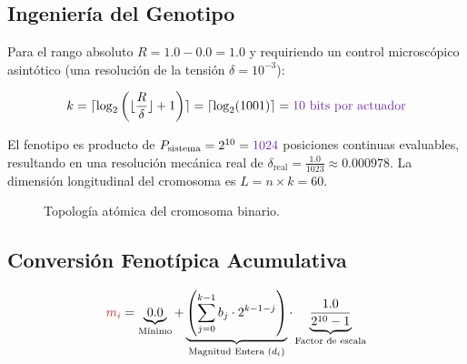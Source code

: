 \documentclass[11pt, a4paper]{article}
\begin{document}
\subsection{Ingeniería del Genotipo}
Para el rango absoluto $R = 1.0 - 0.0 = 1.0$ y requiriendo un control microscópico asintótico (una resolución de la tensión $\delta = 10^{-3}$):

\begin{equation}
k = \lceil \log_2\left( \lfloor\frac{R}{\delta}\rfloor + 1 \right) \rceil = \lceil \log_2(1001) \rceil = \textcolor{corepurple}{10 \text{ bits por actuador}}
\end{equation}

El fenotipo es producto de $P_{\text{sistema}} = 2^{10} = \textcolor{corepurple}{1024}$ posiciones continuas evaluables, resultando en una resolución mecánica real de $\delta_{\text{real}} = \frac{1.0}{1023} \approx 0.000978$. La dimensión longitudinal del cromosoma es $L = n \times k = 60$.

\begin{figure}[H]
    \centering
    \caption{Topología atómica del cromosoma binario.}
\end{figure}

\subsection{Conversión Fenotípica Acumulativa}

\begin{equation}
\textcolor{corered}{m_i} = \underbrace{0.0}_{\text{Mínimo}} + \underbrace{\left( \sum_{j=0}^{k-1} b_j \cdot 2^{k-1-j} \right)}_{\text{Magnitud Entera ($d_i$)}} \cdot \underbrace{\frac{1.0}{2^{10}-1}}_{\text{Factor de escala}}
\end{equation}
\end{document}

